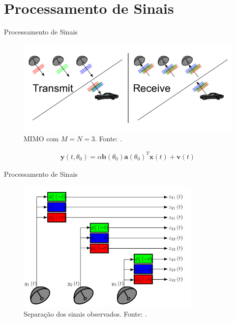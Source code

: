 \documentclass[portuguese]{beamer}
\begin{document}
\section{Processamento de Sinais}

\begin{frame}{Processamento de Sinais}
  \begin{figure}[]
	\centering
	\includegraphics[width=0.9\linewidth]{../report/graphics/rad3.png}
	\caption{MIMO com $M=N=3$. Fonte: \cite{davis2015mimo}.}
	\label{fig:r3}
  \end{figure}
  \begin{align*}
    \mathbf{y}(t,\theta_0) = \alpha\mathbf{b}(\theta_0)\mathbf{a}(\theta_0)^T\mathbf{x}(t)+\mathbf{v}(t)
  \end{align*}
\end{frame}

\begin{frame}{Processamento de Sinais}
  \begin{figure}[]
	\centering
	\includegraphics[height=6.5cm]{../report/graphics/processor.png}
	\caption{Separação dos sinais observados. Fonte: \cite{davis2015mimo}.}
	\label{fig:proc}
  \end{figure}
\end{frame}
\end{document}
